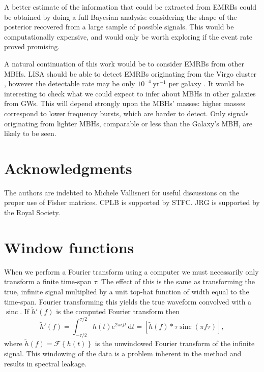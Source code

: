 \documentclass[useAMS,usedcolumn,usegraphicx,usenatbib]{mn2e}
\newcommand{\units}[1]{\ensuremath{~\mathrm{#1}}}
\DeclareMathOperator{\sinc}{sinc}
\newcommand{\dd}{\ensuremath{\mathrm{d}}}
\newcommand{\intd}[4]{\ensuremath{\int_{#1}^{#2}{#3}\,\dd{#4}}}
\begin{document}
A better estimate of the information that could be extracted from EMRBs could be obtained by doing a full Bayesian analysis: considering the shape of the posterior recovered from a large sample of possible signals. This would be computationally expensive, and would only be worth exploring if the event rate proved promising.

A natural continuation of this work would be to consider EMRBs from other MBHs. LISA should be able to detect EMRBs originating from the Virgo cluster \citep{Rubbo2006}, however the detectable rate may be only $10^{-4}\units{yr^{-1}}$ per galaxy \citep{Hopman2007}. It would be interesting to check what we could expect to infer about MBHs in other galaxies from GWs. This will depend strongly upon the MBHs' masses: higher masses correspond to lower frequency bursts, which are harder to detect. Only signals originating from lighter MBHs, comparable or less than the Galaxy's MBH, are likely to be seen.

\section*{Acknowledgments}

The authors are indebted to Michele Vallisneri for useful discussions on the proper use of Fisher matrices. CPLB is supported by STFC. JRG is supported by the Royal Society.




\appendix

\section{Window functions}\label{ap:window}

When we perform a Fourier transform using a computer we must necessarily only transform a finite time-span $\tau$. The effect of this is the same as transforming the true, infinite signal multiplied by a unit top-hat function of width equal to the time-span. Fourier transforming this yields the true waveform convolved with a $\sinc$. If $\tilde{h}'(f)$ is the computed Fourier transform then
\begin{equation}
\tilde{h}'(f) = \intd{-\tau/2}{\tau/2}{h(t)e^{2\pi i ft}}{t} = \left[\tilde{h}(f) \ast \tau \sinc(\pi f\tau)\right],
\end{equation}
where $\tilde{h}(f) = \mathscr{F}\left\{h(t)\right\}$ is the unwindowed Fourier transform of the infinite signal. This windowing of the data is a problem inherent in the method and results in spectral leakage.
\end{document}

